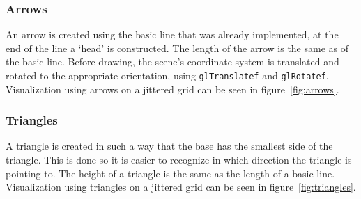 		\subsubsection{Arrows}
			An arrow is created using the basic line that was already implemented, at the end of the line a `head' is constructed.
			The length of the arrow is the same as of the basic line. 
			Before drawing, the scene's coordinate system is translated and rotated to the appropriate orientation, using \texttt{glTranslatef} and \texttt{glRotatef}.
			Visualization using arrows on a jittered grid can be seen in figure~\ref{fig:arrows}.


		\subsubsection{Triangles}
			A triangle is created in such a way that the base has the smallest side of the triangle.
			This is done so it is easier to recognize in which direction the triangle is pointing to.
			The height of a triangle is the same as the length of a basic line.
			Visualization using triangles on a jittered grid can be seen in figure~\ref{fig:triangles}.
